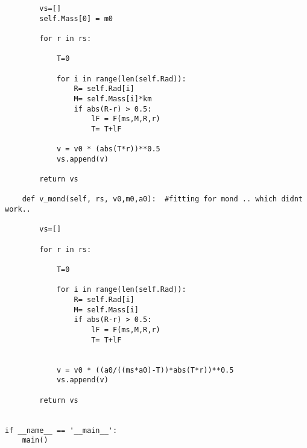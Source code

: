 \begin{verbatim}
        vs=[]
        self.Mass[0] = m0

        for r in rs:

            T=0

            for i in range(len(self.Rad)):
                R= self.Rad[i]
                M= self.Mass[i]*km
                if abs(R-r) > 0.5:
                    lF = F(ms,M,R,r)
                    T= T+lF

            v = v0 * (abs(T*r))**0.5
            vs.append(v)

        return vs

    def v_mond(self, rs, v0,m0,a0):  #fitting for mond .. which didnt work..

        vs=[]

        for r in rs:

            T=0

            for i in range(len(self.Rad)):
                R= self.Rad[i]
                M= self.Mass[i]
                if abs(R-r) > 0.5:
                    lF = F(ms,M,R,r)
                    T= T+lF


            v = v0 * ((a0/((ms*a0)-T))*abs(T*r))**0.5
            vs.append(v)

        return vs


if __name__ == '__main__':
    main()




\end{verbatim}